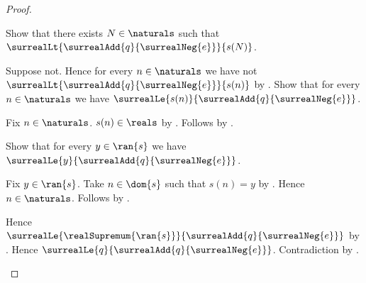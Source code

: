 \begin{proof}
\begin{subproof}
        Show that there exists $N\in\naturals$ such that
            $\surrealLt{\surrealAdd{q}{\surrealNeg{e}}}{s(N)}$.
        \begin{subproof}
            Suppose not.
            Hence for every $n\in\naturals$ we have
                not $\surrealLt{\surrealAdd{q}{\surrealNeg{e}}}{s(n)}$
                by \auto.
            Show that for every $n\in\naturals$ we have
                $\surrealLe{s(n)}
                    {\surrealAdd{q}{\surrealNeg{e}}}$.
            \begin{subproof}
                Fix $n\in\naturals$.
                $s(n)\in\reals$ by .
                Follows by
                    .
            \end{subproof}
            Show that for every $y\in\ran{s}$ we have
                $\surrealLe{y}{\surrealAdd{q}{\surrealNeg{e}}}$.
            \begin{subproof}
                Fix $y\in\ran{s}$.
                Take $n\in\dom{s}$ such that $s(n)=y$ by
                    .
                Hence $n\in\naturals$.
                Follows by \auto.
            \end{subproof}
            Hence $\surrealLe{\realSupremum{\ran{s}}}
                {\surrealAdd{q}{\surrealNeg{e}}}$ by
                .
            Hence $\surrealLe{q}{\surrealAdd{q}{\surrealNeg{e}}}$.
            Contradiction by
                .
        \end{subproof}


\end{subproof}
\end{proof}
